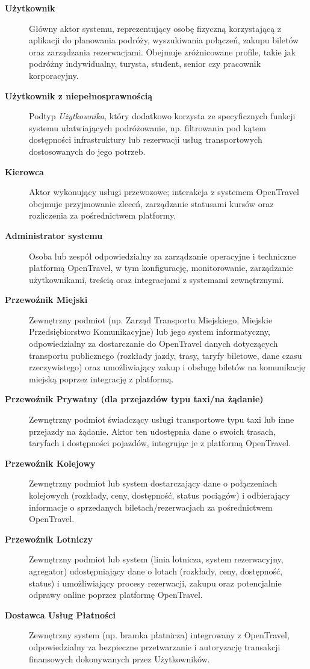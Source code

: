 \documentclass[a4paper,12pt]{article}
\begin{document}
\begin{description}
    \item[\textbf{Użytkownik}] Główny aktor systemu, reprezentujący osobę fizyczną korzystającą z aplikacji do planowania podróży, wyszukiwania połączeń, zakupu biletów oraz zarządzania rezerwacjami. Obejmuje zróżnicowane profile, takie jak podróżny indywidualny, turysta, student, senior czy pracownik korporacyjny.
    \item[\textbf{Użytkownik z niepełnosprawnością}] Podtyp \textit{Użytkownika}, który dodatkowo korzysta ze specyficznych funkcji systemu ułatwiających podróżowanie, np. filtrowania pod kątem dostępności infrastruktury lub rezerwacji usług transportowych dostosowanych do jego potrzeb.
    \item[\textbf{Kierowca}] Aktor wykonujący usługi przewozowe; interakcja z systemem OpenTravel obejmuje przyjmowanie zleceń, zarządzanie statusami kursów oraz rozliczenia za pośrednictwem platformy.
    \item[\textbf{Administrator systemu}] Osoba lub zespół odpowiedzialny za zarządzanie operacyjne i techniczne platformą OpenTravel, w tym konfigurację, monitorowanie, zarządzanie użytkownikami, treścią oraz integracjami z systemami zewnętrznymi.
    \item[\textbf{Przewoźnik Miejski}] Zewnętrzny podmiot (np. Zarząd Transportu Miejskiego, Miejskie Przedsiębiorstwo Komunikacyjne) lub jego system informatyczny, odpowiedzialny za dostarczanie do OpenTravel danych dotyczących transportu publicznego (rozkłady jazdy, trasy, taryfy biletowe, dane czasu rzeczywistego) oraz umożliwiający zakup i obsługę biletów na komunikację miejską poprzez integrację z platformą.
    \item[\textbf{Przewoźnik Prywatny (dla przejazdów typu taxi/na żądanie)}] Zewnętrzny podmiot świadczący usługi transportowe typu taxi lub inne przejazdy na żądanie. Aktor ten udostępnia dane o swoich trasach, taryfach i dostępności pojazdów, integrując je z platformą OpenTravel.
    \item[\textbf{Przewoźnik Kolejowy}] Zewnętrzny podmiot lub system dostarczający dane o połączeniach kolejowych (rozkłady, ceny, dostępność, status pociągów) i odbierający informacje o sprzedanych biletach/rezerwacjach za pośrednictwem OpenTravel.
    \item[\textbf{Przewoźnik Lotniczy}] Zewnętrzny podmiot lub system (linia lotnicza, system rezerwacyjny, agregator) udostępniający dane o lotach (rozkłady, ceny, dostępność, status) i umożliwiający procesy rezerwacji, zakupu oraz potencjalnie odprawy online poprzez platformę OpenTravel.
    \item[\textbf{Dostawca Usług Płatności}] Zewnętrzny system (np. bramka płatnicza) integrowany z OpenTravel, odpowiedzialny za bezpieczne przetwarzanie i autoryzację transakcji finansowych dokonywanych przez Użytkowników.
\end{description}
\end{document}
